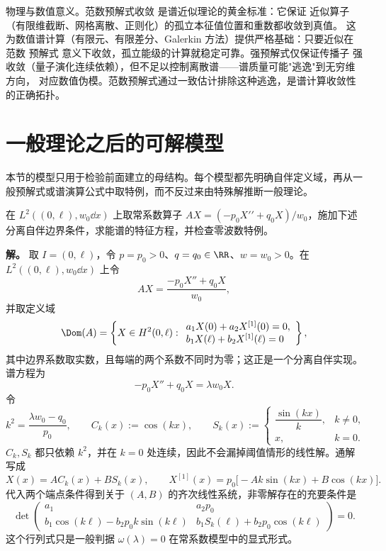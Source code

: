 物理与数值意义。范数预解式收敛 是谱近似理论的黄金标准：它保证
近似算子（有限维截断、网格离散、正则化）的孤立本征值位置和重数都收敛到真值。
这为数值谱计算（有限元、有限差分、Galerkin 方法）提供严格基础：只要近似在 范数
预解式 意义下收敛，孤立能级的计算就稳定可靠。强预解式仅保证传播子
强收敛（量子演化连续依赖），但不足以控制离散谱——谱质量可能"逃逸"到无穷维方向，
对应数值伪模。范数预解式通过一致估计排除这种逃逸，是谱计算收敛性的正确拓扑。



\section{一般理论之后的可解模型}

本节的模型只用于检验前面建立的母结构。每个模型都先明确自伴定义域，再从一般预解式或谱演算公式中取特例，而不反过来由特殊解推断一般理论。
\begin{exbox}[常系数分离边界的特征方程]
\label{ex:math-sl-regular-robin-eigen}
在 $L^2((0,\ell),w_0\dd x)$ 上取常系数算子 $AX=(-p_0X\prime\prime+q_0X)/w_0$，施加下述分离自伴边界条件，求能谱的特征方程，并检查零波数特例。

\textbf{解。} 取 $I=(0,\ell)$，令 $p=p_0>0$、$q=q_0\in\RR$、$w=w_0>0$。在 $L^2((0,\ell),w_0\dd x)$ 上令
\[
 AX=\frac{-p_0X''+q_0X}{w_0},
\]
并取定义域
\[
 \Dom(A)=\left\{X\in H^2(0,\ell):
 \begin{array}{l}
 a_1X(0)+a_2X^{[1]}(0)=0,\\
 b_1X(\ell)+b_2X^{[1]}(\ell)=0
 \end{array}\right\},
\]
其中边界系数取实数，且每端的两个系数不同时为零；这正是一个分离自伴实现。谱方程为
\[
 -p_0X''+q_0X=\lambda w_0X.
\]
令
\[
 k^2=\frac{\lambda w_0-q_0}{p_0},
 \qquad
 C_k(x):=\cos(kx),
 \qquad
 S_k(x):=
 \begin{cases}
 \dfrac{\sin(kx)}{k},&k\neq0,\\[1ex]
 x,&k=0.
 \end{cases}
\]
$C_k,S_k$ 都只依赖 $k^2$，并在 $k=0$ 处连续，因此不会漏掉阈值情形的线性解。通解写成
\[
 X(x)=A C_k(x)+B S_k(x),
 \qquad
 X^{[1]}(x)=p_0\bigl[-A k\sin(kx)+B\cos(kx)\bigr].
\]
代入两个端点条件得到关于 $(A,B)$ 的齐次线性系统，非零解存在的充要条件是
\begin{equation*}\det\begin{pmatrix}
 a_1&a_2p_0\\
 b_1\cos(k\ell)-b_2p_0k\sin(k\ell)&
 b_1S_k(\ell)+b_2p_0\cos(k\ell)
 \end{pmatrix}=0.
\end{equation*}
这个行列式只是一般判据 $\omega(\lambda)=0$ 在常系数模型中的显式形式。
\end{exbox}

